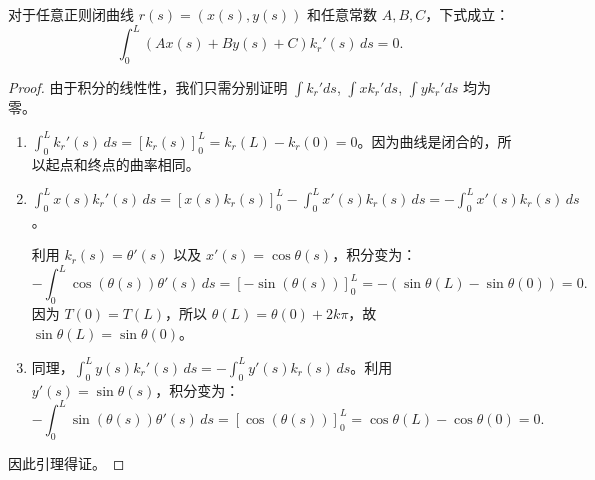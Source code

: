 \documentclass[lang=cn,10pt,thmcnt=section]{elegantbook}
\begin{document}
\begin{lemma}\label{lem:integral}
对于任意正则闭曲线 $r(s)=(x(s), y(s))$ 和任意常数 $A, B, C$，下式成立：
\[ \int_0^{L} (Ax(s) + By(s) + C) k_r'(s) \, ds = 0. \]
\end{lemma}
\begin{proof}
由于积分的线性性，我们只需分别证明 $\int k_r' ds$, $\int x k_r' ds$, $\int y k_r' ds$ 均为零。
\begin{enumerate}
    \item $\displaystyle \int_0^{L} k_r'(s) \, ds = \left[ k_r(s) \right]_0^{L} = k_r(L) - k_r(0) = 0$。因为曲线是闭合的，所以起点和终点的曲率相同。
    \item $\displaystyle \int_0^{L} x(s) k_r'(s) \, ds = \left[ x(s) k_r(s) \right]_0^{L} - \int_0^{L} x'(s) k_r(s) \, ds = -\int_0^{L} x'(s) k_r(s) \, ds$。
    
    利用 $k_r(s) = \theta'(s)$ 以及 $x'(s) = \cos\theta(s)$，积分变为：
    \[ -\int_0^{L} \cos(\theta(s)) \theta'(s) \, ds = \left[ -\sin(\theta(s)) \right]_0^{L} = -(\sin\theta(L) - \sin\theta(0)) = 0. \]
    因为 $T(0)=T(L)$，所以 $\theta(L) = \theta(0) + 2k\pi$，故 $\sin\theta(L)=\sin\theta(0)$。
    \item 同理，$\displaystyle \int_0^{L} y(s) k_r'(s) \, ds = -\int_0^{L} y'(s) k_r(s) \, ds$。利用 $y'(s) = \sin\theta(s)$，积分变为：
    \[ -\int_0^{L} \sin(\theta(s)) \theta'(s) \, ds = \left[ \cos(\theta(s)) \right]_0^{L} = \cos\theta(L) - \cos\theta(0) = 0. \]
\end{enumerate}
因此引理得证。
\end{proof}
\end{document}
